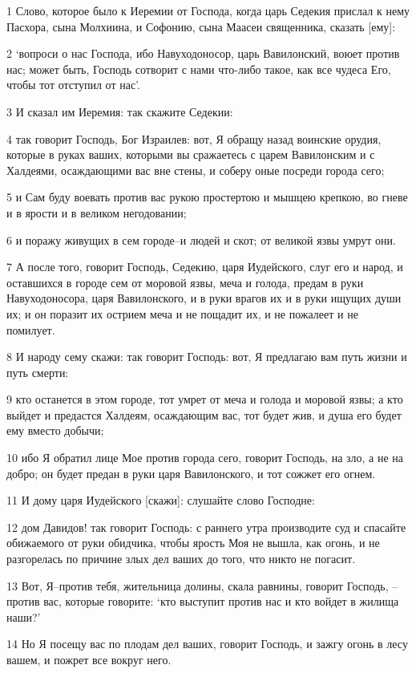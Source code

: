 \par 1 Слово, которое было к Иеремии от Господа, когда царь Седекия прислал к нему Пасхора, сына Молхиина, и Софонию, сына Маасеи священника, сказать [ему]:
\par 2 `вопроси о нас Господа, ибо Навуходоносор, царь Вавилонский, воюет против нас; может быть, Господь сотворит с нами что-либо такое, как все чудеса Его, чтобы тот отступил от нас'.
\par 3 И сказал им Иеремия: так скажите Седекии:
\par 4 так говорит Господь, Бог Израилев: вот, Я обращу назад воинские орудия, которые в руках ваших, которыми вы сражаетесь с царем Вавилонским и с Халдеями, осаждающими вас вне стены, и соберу оные посреди города сего;
\par 5 и Сам буду воевать против вас рукою простертою и мышцею крепкою, во гневе и в ярости и в великом негодовании;
\par 6 и поражу живущих в сем городе--и людей и скот; от великой язвы умрут они.
\par 7 А после того, говорит Господь, Седекию, царя Иудейского, слуг его и народ, и оставшихся в городе сем от моровой язвы, меча и голода, предам в руки Навуходоносора, царя Вавилонского, и в руки врагов их и в руки ищущих души их; и он поразит их острием меча и не пощадит их, и не пожалеет и не помилует.
\par 8 И народу сему скажи: так говорит Господь: вот, Я предлагаю вам путь жизни и путь смерти:
\par 9 кто останется в этом городе, тот умрет от меча и голода и моровой язвы; а кто выйдет и предастся Халдеям, осаждающим вас, тот будет жив, и душа его будет ему вместо добычи;
\par 10 ибо Я обратил лице Мое против города сего, говорит Господь, на зло, а не на добро; он будет предан в руки царя Вавилонского, и тот сожжет его огнем.
\par 11 И дому царя Иудейского [скажи]: слушайте слово Господне:
\par 12 дом Давидов! так говорит Господь: с раннего утра производите суд и спасайте обижаемого от руки обидчика, чтобы ярость Моя не вышла, как огонь, и не разгорелась по причине злых дел ваших до того, что никто не погасит.
\par 13 Вот, Я--против тебя, жительница долины, скала равнины, говорит Господь, --против вас, которые говорите: `кто выступит против нас и кто войдет в жилища наши?'
\par 14 Но Я посещу вас по плодам дел ваших, говорит Господь, и зажгу огонь в лесу вашем, и пожрет все вокруг него.


